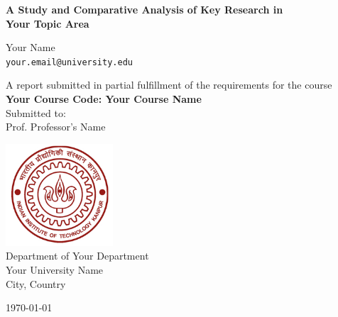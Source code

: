\documentclass[11pt, a4paper]{article}
\begin{document}
\begin{titlepage}
    \centering
    {\Huge \bfseries A Study and Comparative Analysis of Key Research in \\ \vspace{0.5em} \LARGE Your Topic Area \par}
    \vspace{2cm}
    {\Large Your Name \\ \texttt{your.email@university.edu} \par}
    \vspace{1cm}
    
    A report submitted in partial fulfillment of the requirements for the course
    \\[0.5cm]
    {\large \bfseries Your Course Code: Your Course Name}
    \\[1cm]
    
    Submitted to:
    \\
    {\large Prof. Professor's Name}
    
    \vspace{1cm}
    {\large \includegraphics[width=0.3\textwidth]{redlogo.jpg}} %
    \\[1cm]
    {\large Department of Your Department}
    \\
    {\large Your University Name}
    \\
    {\large City, Country}
    \\[1cm]
    
    {\large \today \par}
\end{titlepage}

\tableofcontents
\newpage

\end{document}
